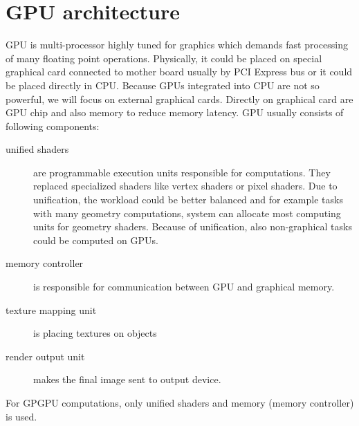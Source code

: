 \section{GPU architecture}
GPU is multi-processor highly tuned for graphics which demands fast processing of many floating point operations. Physically, it could be placed on special graphical card connected to mother board usually by PCI Express bus or it could be placed directly in CPU. Because GPUs integrated into CPU are not so powerful, we will focus on external graphical cards. Directly on graphical card are GPU chip and also memory to reduce memory latency. GPU usually consists of following components:
\begin{description}
\item[unified shaders] are programmable execution units responsible for computations. They replaced specialized shaders like vertex shaders or pixel shaders. Due to unification, the workload could be better balanced and for example tasks with many geometry computations, system can allocate most computing units for geometry shaders. Because of unification, also non-graphical tasks could be computed on GPUs.
\item[memory controller] is responsible for communication between GPU and graphical memory.
\item[texture mapping unit] is placing textures on objects
\item[render output unit] makes the final image sent to output device.
\end{description}
For GPGPU computations, only unified shaders and memory (memory controller) is used.

